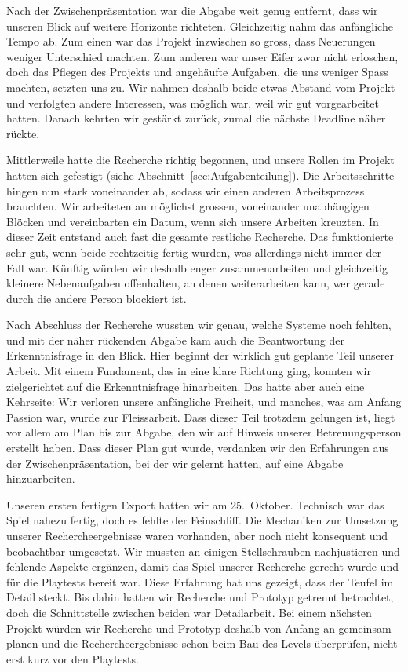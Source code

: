\documentclass[../Main.tex]{subfiles}
\begin{document}
Nach der Zwischenpräsentation war die Abgabe weit genug entfernt, dass wir unseren Blick auf weitere Horizonte richteten. Gleichzeitig nahm das anfängliche Tempo ab. Zum einen war das Projekt inzwischen so gross, dass Neuerungen weniger Unterschied machten. Zum anderen war unser Eifer zwar nicht erloschen, doch das Pflegen des Projekts und angehäufte Aufgaben, die uns weniger Spass machten, setzten uns zu. Wir nahmen deshalb beide etwas Abstand vom Projekt und verfolgten andere Interessen, was möglich war, weil wir gut vorgearbeitet hatten. Danach kehrten wir gestärkt zurück, zumal die nächste Deadline näher rückte.

Mittlerweile hatte die Recherche richtig begonnen, und unsere Rollen im Projekt hatten sich gefestigt (siehe Abschnitt~\ref{sec:Aufgabenteilung}). Die Arbeitsschritte hingen nun stark voneinander ab, sodass wir einen anderen Arbeitsprozess brauchten. Wir arbeiteten an möglichst grossen, voneinander unabhängigen Blöcken und vereinbarten ein Datum, wenn sich unsere Arbeiten kreuzten. In dieser Zeit entstand auch fast die gesamte restliche Recherche. Das funktionierte sehr gut, wenn beide rechtzeitig fertig wurden, was allerdings nicht immer der Fall war. Künftig würden wir deshalb enger zusammenarbeiten und gleichzeitig kleinere Nebenaufgaben offenhalten, an denen weiterarbeiten kann, wer gerade durch die andere Person blockiert ist.

Nach Abschluss der Recherche wussten wir genau, welche Systeme noch fehlten, und mit der näher rückenden Abgabe kam auch die Beantwortung der Erkenntnisfrage in den Blick. Hier beginnt der wirklich gut geplante Teil unserer Arbeit. Mit einem Fundament, das in eine klare Richtung ging, konnten wir zielgerichtet auf die Erkenntnisfrage hinarbeiten. Das hatte aber auch eine Kehrseite: Wir verloren unsere anfängliche Freiheit, und manches, was am Anfang Passion war, wurde zur Fleissarbeit. Dass dieser Teil trotzdem gelungen ist, liegt vor allem am Plan bis zur Abgabe, den wir auf Hinweis unserer Betreuungsperson erstellt haben. Dass dieser Plan gut wurde, verdanken wir den Erfahrungen aus der Zwischenpräsentation, bei der wir gelernt hatten, auf eine Abgabe hinzuarbeiten.

Unseren ersten fertigen Export hatten wir am 25.~Oktober. Technisch war das Spiel nahezu fertig, doch es fehlte der Feinschliff. Die Mechaniken zur Umsetzung unserer Rechercheergebnisse waren vorhanden, aber noch nicht konsequent und beobachtbar umgesetzt. Wir mussten an einigen Stellschrauben nachjustieren und fehlende Aspekte ergänzen, damit das Spiel unserer Recherche gerecht wurde und für die Playtests bereit war. Diese Erfahrung hat uns gezeigt, dass der Teufel im Detail steckt. Bis dahin hatten wir Recherche und Prototyp getrennt betrachtet, doch die Schnittstelle zwischen beiden war Detailarbeit. Bei einem nächsten Projekt würden wir Recherche und Prototyp deshalb von Anfang an gemeinsam planen und die Rechercheergebnisse schon beim Bau des Levels überprüfen, nicht erst kurz vor den Playtests.
\end{document}
